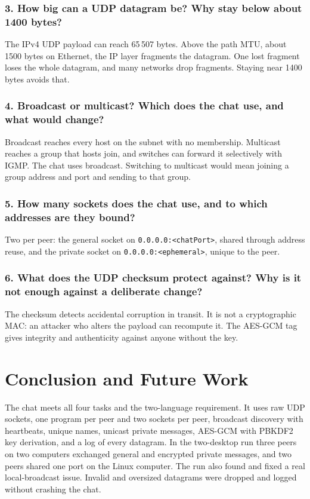 \documentclass[12pt,a4paper]{article}
\begin{document}
\subsubsection{3. How big can a UDP datagram be? Why stay below about 1400 bytes?}
The IPv4 UDP payload can reach 65\,507 bytes. Above the path MTU, about 1500 bytes
on Ethernet, the IP layer fragments the datagram. One lost fragment loses the whole
datagram, and many networks drop fragments. Staying near 1400 bytes avoids that.

\subsubsection{4. Broadcast or multicast? Which does the chat use, and what would change?}
Broadcast reaches every host on the subnet with no membership. Multicast reaches a
group that hosts join, and switches can forward it selectively with IGMP. The chat
uses broadcast. Switching to multicast would mean joining a group address and port
and sending to that group.

\subsubsection{5. How many sockets does the chat use, and to which addresses are they bound?}
Two per peer: the general socket on \texttt{0.0.0.0:<chatPort>}, shared through
address reuse, and the private socket on \texttt{0.0.0.0:<ephemeral>}, unique to
the peer.

\subsubsection{6. What does the UDP checksum protect against? Why is it not enough against a deliberate change?}
The checksum detects accidental corruption in transit. It is not a cryptographic
MAC: an attacker who alters the payload can recompute it. The AES-GCM tag gives
integrity and authenticity against anyone without the key.

\section{Conclusion and Future Work}
The chat meets all four tasks and the two-language requirement. It uses raw UDP
sockets, one program per peer and two sockets per peer, broadcast discovery with
heartbeats, unique names, unicast private messages, AES-GCM with PBKDF2 key
derivation, and a log of every datagram. In the two-desktop run three peers on two
computers exchanged general and encrypted private messages, and two peers shared one
port on the Linux computer. The run also found and fixed a real local-broadcast
issue. Invalid and oversized datagrams were dropped and logged without crashing the
chat.
\end{document}
